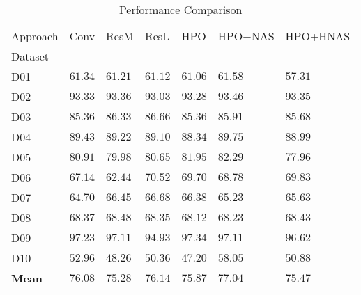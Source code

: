 \begin{table}
\caption{Performance Comparison}
\label{tab:results}
\begin{tabular}{lllllll}
\toprule
Approach & Conv & ResM & ResL & HPO & HPO+NAS & HPO+HNAS \\
Dataset &  &  &  &  &  &  \\
\midrule
D01 & $61.34$ & $61.21$ & $61.12$ & $61.06$ & $\mathbf{61.58}$ & $57.31$ \\
D02 & $93.33$ & $93.36$ & $93.03$ & $93.28$ & $\mathbf{93.46}$ & $93.35$ \\
D03 & $85.36$ & $86.33$ & $\mathbf{86.66}$ & $85.36$ & $85.91$ & $85.68$ \\
D04 & $89.43$ & $89.22$ & $89.10$ & $88.34$ & $\mathbf{89.75}$ & $88.99$ \\
D05 & $80.91$ & $79.98$ & $80.65$ & $81.95$ & $\mathbf{82.29}$ & $77.96$ \\
D06 & $67.14$ & $62.44$ & $\mathbf{70.52}$ & $69.70$ & $68.78$ & $69.83$ \\
D07 & $64.70$ & $66.45$ & $\mathbf{66.68}$ & $66.38$ & $65.23$ & $65.63$ \\
D08 & $68.37$ & $\mathbf{68.48}$ & $68.35$ & $68.12$ & $68.23$ & $68.43$ \\
D09 & $97.23$ & $97.11$ & $94.93$ & $\mathbf{97.34}$ & $97.11$ & $96.62$ \\
D10 & $52.96$ & $48.26$ & $50.36$ & $47.20$ & $\mathbf{58.05}$ & $50.88$ \\
\textbf{Mean} & $76.08$ & $75.28$ & $76.14$ & $75.87$ & $\mathbf{77.04}$ & $75.47$ \\
\bottomrule
\end{tabular}
\end{table}
